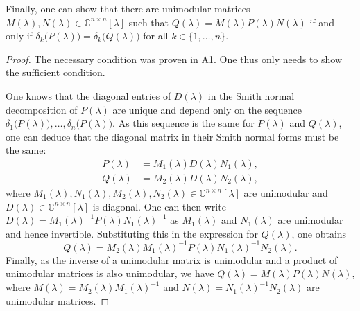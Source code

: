 \documentclass[11pt]{article}
\newcommand{\complex}{\mathbb{C}} %
\begin{document}
Finally, one can show that there are unimodular matrices $M(\lambda),N(\lambda)\in\complex^{n\times n}[\lambda]$ such that $Q(\lambda)=M(\lambda)P(\lambda)N(\lambda)$ if and only if $\delta_k\big(P(\lambda)\big)=\delta_k\big(Q(\lambda)\big)$ for all $k\in\{1,\dots,n\}$.
\begin{proof}
The necessary condition was proven in A1.
One thus only needs to show the sufficient condition.

One knows that the diagonal entries of $D(\lambda)$ in the Smith normal decomposition of $P(\lambda)$ are unique and depend only on the sequence $\delta_1\big(P(\lambda)\big),\dots,\delta_n\big(P(\lambda)\big)$. As this sequence is the same for $P(\lambda)$ and $Q(\lambda)$, one can deduce that the diagonal matrix in their Smith normal forms must be the same:
\begin{align*}
    P(\lambda)&=M_1(\lambda) D(\lambda) N_1(\lambda),\\
    Q(\lambda)&=M_2(\lambda) D(\lambda) N_2(\lambda),
\end{align*}
where $M_1(\lambda),N_1(\lambda), M_2(\lambda), N_2(\lambda)\in\complex^{n\times n}[\lambda]$ are unimodular and $D(\lambda)\in\complex^{n\times n}[\lambda]$ is diagonal.
One can then write $D(\lambda)=M_1(\lambda)^{-1} P(\lambda) N_1(\lambda)^{-1}$ as $M_1(\lambda)$ and $N_1(\lambda)$ are unimodular and hence invertible. Substituting this in the expression for \(Q(\lambda)\), one obtains
\begin{equation*}
    Q(\lambda)=M_2(\lambda) M_1(\lambda)^{-1} P(\lambda) N_1(\lambda)^{-1} N_2(\lambda).
\end{equation*}
Finally, as the inverse of a unimodular matrix is unimodular and a product of unimodular matrices is also unimodular, we have $Q(\lambda)=M(\lambda)P(\lambda)N(\lambda)$, where $M(\lambda)=M_2(\lambda) M_1(\lambda)^{-1}$ and $N(\lambda)=N_1(\lambda)^{-1} N_2(\lambda)$ are unimodular matrices.
\end{proof}
\end{document}
